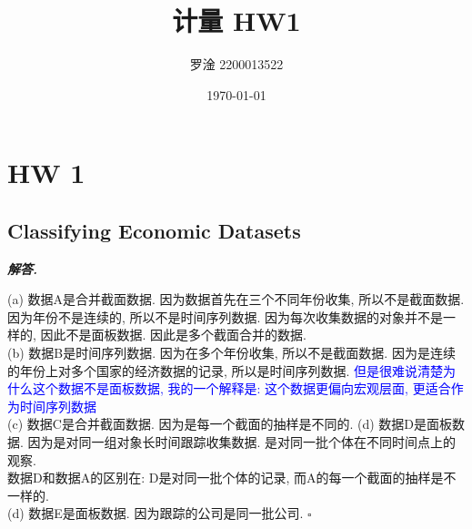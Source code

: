 \documentclass[10pt, a4paper, oneside]{ctexart}
\title{\textbf{计量 HW1}}
\author{罗淦 2200013522}
\date{\today}
\newenvironment{solution}{%
  \par\noindent\textbf{\textit{解答. }}\ignorespaces
}{%
  \hfill\ensuremath{\square}\par %
}
\begin{document}
\maketitle

\section{HW 1}

\subsection{Classifying Economic Datasets}

\begin{solution}
(a) 数据A是合并截面数据. 因为数据首先在三个不同年份收集, 所以不是截面数据. 因为年份不是连续的, 所以不是时间序列数据. 因为每次收集数据的对象并不是一样的, 因此不是面板数据. 因此是多个截面合并的数据.\\
(b) 数据B是时间序列数据. 因为在多个年份收集, 所以不是截面数据. 因为是连续的年份上对多个国家的经济数据的记录, 所以是时间序列数据. \textcolor{blue}{但是很难说清楚为什么这个数据不是面板数据, 我的一个解释是: 这个数据更偏向宏观层面, 更适合作为时间序列数据}\\
(c) 数据C是合并截面数据. 因为是每一个截面的抽样是不同的.
(d) 数据D是面板数据. 因为是对同一组对象长时间跟踪收集数据. 是对同一批个体在不同时间点上的观察.\\数据D和数据A的区别在:  D是对同一批个体的记录, 而A的每一个截面的抽样是不一样的.\\
(d) 数据E是面板数据. 因为跟踪的公司是同一批公司.
\end{solution}
\end{document}
